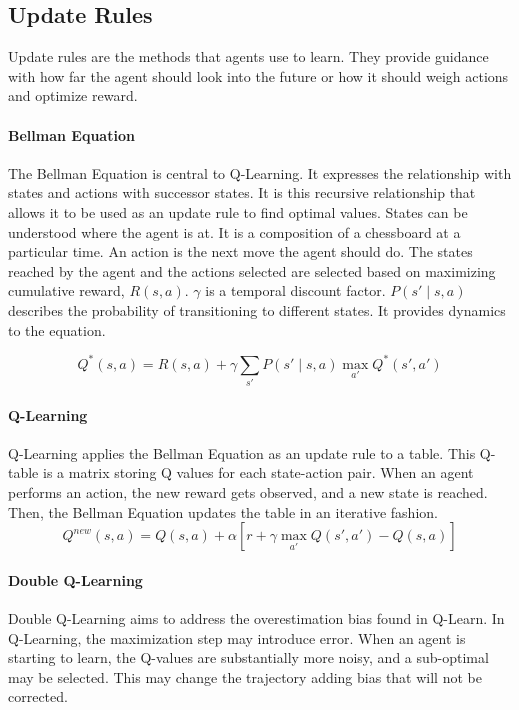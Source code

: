 \documentclass[conference]{IEEEtran}
\begin{document}
\subsection{Update Rules}
Update rules are the methods that agents use to learn. They provide guidance with how far the agent should look into the future or how it should weigh actions and optimize reward. 

\vspace{2mm}
\paragraph{Bellman Equation}
The Bellman Equation is central to Q-Learning. It expresses the relationship with states and actions with successor states. It is this recursive relationship that allows it to be used as an update rule to find optimal values. States can be understood where the agent is at. It is a composition of a chessboard at a particular time. An action is the next move the agent should do. The states reached by the agent and the actions selected are selected based on maximizing cumulative reward, $R(s,a)$. $\gamma$ is a temporal discount factor.  $P(s' \mid s, a)$ describes the probability of transitioning to different states. It provides dynamics to the equation.  

\vspace{-4mm}
\begin{equation}
    Q^*(s, a) = R(s, a) + \gamma \sum_{s'} P(s' \mid s, a) \max_{a'} Q^*(s', a') 
\end{equation}

\vspace{-2mm}
\paragraph{Q-Learning}
Q-Learning applies the Bellman Equation as an update rule to a table. This Q-table is a matrix storing Q values for each state-action pair. When an agent performs an action, the new reward gets observed, and a new state is reached. Then, the Bellman Equation updates the table in an iterative fashion. 
\begin{equation}
    Q^{new}(s, a) = Q(s, a) + \alpha \left[ r + \gamma \max_{a'} Q(s', a') - Q(s, a) \right]
\end{equation}

\paragraph{Double Q-Learning}
Double Q-Learning aims to address the overestimation bias found in Q-Learn. In Q-Learning, the maximization step may introduce error. When an agent is starting to learn, the Q-values are substantially more noisy, and a sub-optimal may be selected. This may change the trajectory adding bias that will not be corrected. 
\end{document}
